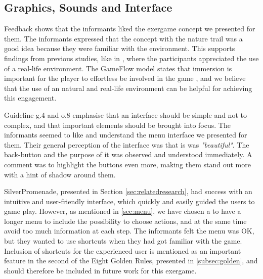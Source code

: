 \subsection{Graphics, Sounds and Interface}

Feedback shows that the informants liked the exergame concept we presented for them. The informants expressed that the concept with the nature trail was a good idea because they were familiar with the environment. This supports findings from previous studies, like in \cite{gerling2}, where the participants appreciated the use of a real-life environment. The GameFlow model states that immersion is important for the player to effortless be involved in the game \cite{sweetser}, and we believe that the use of an natural and real-life environment can be helpful for achieving this engagement. 

Guideline g.4 and o.8 emphasise that an interface should be simple and not to complex, and that important elements should be brought into focus. The informants seemed to like and understand the menu interface we presented for them. Their general perception of the interface was that is was \emph{"beautiful"}. The back-button and the purpose of it was observed and understood immediately. A comment was to highlight the buttons even more, making them stand out more with a hint of shadow around them. 

SilverPromenade, presented in Section \ref{sec:relatedresearch}, had success with an intuitive and user-friendly interface, which quickly and easily guided the users to game play. However, as mentioned in \ref{sec:menu}, we have chosen a to have a longer menu to include the possibility to choose actions, and at the same time avoid too much information at each step. The informants felt the menu was OK, but they wanted to use shortcuts when they had got familiar with the game. Inclusion of shortcuts for the experienced user is mentioned as an important feature in the second of the Eight Golden Rules, presented in \ref{subsec:golden}, and should therefore be included in future work for this exergame.

